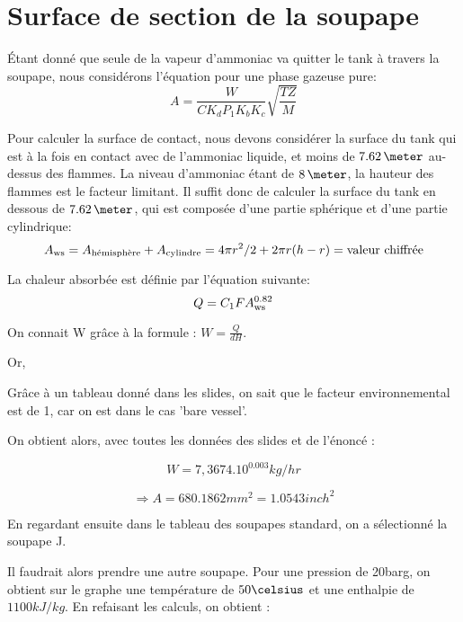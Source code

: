 \section{Surface de section de la soupape}
Étant donné que seule de la vapeur d'ammoniac
va quitter le tank à travers la soupape,
nous considérons l'équation pour une phase gazeuse pure:
\begin{equation*}
    A=\frac{W}{CK_dP_1K_bK_c} \sqrt{\frac{TZ}{M}}
\end{equation*}

Pour calculer la surface de contact,
nous devons considérer la surface du tank qui est à la fois en contact
avec de l'ammoniac liquide, et moins de $7.62\,\meter$ au-dessus des flammes.
La niveau d'ammoniac étant de $8\,\meter$,
la hauteur des flammes est le facteur limitant.
Il suffit donc de calculer la surface du tank en dessous de $7.62\,\meter$,
qui est composée d'une partie sphérique et d'une partie cylindrique:
\begin{equation*}
    A_{\mbox{\scriptsize{ws}}} = A_{\mbox{\scriptsize{hémisphère}}} + A_{\mbox{\scriptsize{cylindre}}}
    = 4\pi r^2/2 + 2\pi r (h-r)
    = \mbox{valeur chiffrée}
\end{equation*}

La chaleur absorbée est définie par l'équation suivante:
\begin{equation*}
    Q = C_1 F A_{\mbox{\scriptsize{ws}}}^{0.82}
\end{equation*}

On connait W grâce à la formule : $W=\frac{Q}{dH}$.

Or,

Grâce à un tableau donné dans les slides, on sait que le facteur environnemental est de 1, car on est dans le cas 'bare vessel'.

On obtient alors, avec toutes les données des slides et de l'énoncé : 

$$W=7,3674 . 10^{0.003} kg/hr$$

$$\Rightarrow A=680.1862mm^2=1.0543 inch^2$$

En regardant ensuite dans le tableau des soupapes standard, on a sélectionné la soupape J.

Il faudrait alors prendre une autre soupape. Pour une pression de 20barg, on obtient sur le graphe une température de $50 \celsius$ et une enthalpie de $1100 kJ/kg$. En refaisant les calculs, on obtient :

